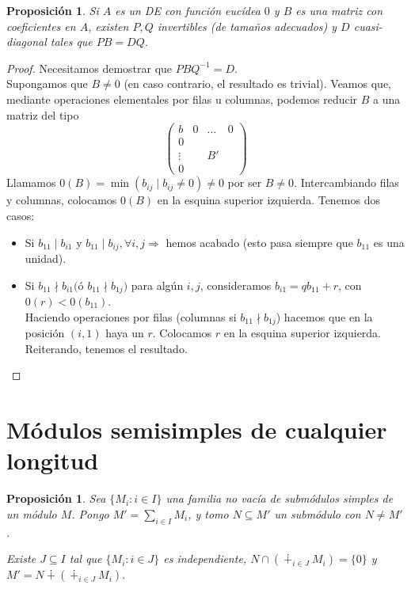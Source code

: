 \documentclass[11pt,a4paper]{article}
\theoremstyle{break}
\newtheorem{proposition}[theorem]{Proposición}
\begin{document}
\begin{proposition}
Si $A$ es un DE con función eucídea $0$ y $B$ es una matriz con coeficientes en $A$, existen $P, Q$ invertibles (de tamaños adecuados) y $D$ cuasi-diagonal tales que $PB = DQ$.
\end{proposition}

\begin{proof}
Necesitamos demostrar que $PBQ^{-1}=D$. \\
Supongamos que $B \neq 0$ (en caso contrario, el resultado es trivial). Veamos que, mediante operaciones elementales por filas u columnas, podemos reducir $B$ a una matriz del tipo
$$\begin{pmatrix}
b & 0 & \dots & 0 \\
0 &  \\
\vdots & & B' \\
0 
\end{pmatrix}$$
Llamamos $0(B) = \min(b_{ij} \mid b_{ij} \neq 0) \neq 0$ por ser $B \neq 0$. Intercambiando filas y columnas, colocamos $0(B)$ en la esquina superior izquierda. Tenemos dos casos:
\begin{itemize}
\item Si $b_{11} \mid b_{i1}$ y $b_{11} \mid b_{ij}, \forall i, j \Rightarrow$ hemos acabado (esto pasa siempre que $b_{11}$ es una unidad).
\item Si $b_{11} \nmid b_{i1} ($ó $b_{11} \nmid b_{1j})$ para algún $i, j$, consideramos $b_{i1} = qb_{11} + r$, con $0(r) < 0(b_{11})$. \\
Haciendo operaciones por filas (columnas si $b_{11} \nmid b_{1j}$) hacemos que en la posición $(i, 1)$ haya un $r$. Colocamos $r$ en la esquina superior izquierda. Reiterando, tenemos el resultado.
\end{itemize}
\end{proof}


\newpage

\section{Módulos semisimples de cualquier longitud}

\begin{proposition}
Sea $\{M_{i}: i \in I\}$ una familia no vacía de submódulos simples de un módulo $M$. Pongo $M' = \sum\limits_{i \in I} M_{i}$, y tomo $N \subseteq M'$ un submódulo con $N \neq M'$.

Existe $J \subseteq I$ tal que $\{M_{i}: i \in J\}$ es independiente, $N \cap (\dotplus_{i \in J} M_{i}) = \{0\}$ y $M' = N \dotplus (\dotplus_{i \in J} M_{i})$.
\end{proposition}
\end{document}
